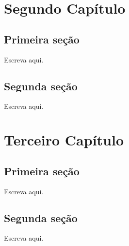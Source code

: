\documentclass[11pt,a4paper,oneside,openany]{book}
\begin{document}

\chapter{Segundo Capítulo}\label{cap:segundo}

\section{Primeira seção}

Escreva aqui.

\section{Segunda seção}

Escreva aqui.

\chapter{Terceiro Capítulo}\label{cap:terceiro}

\section{Primeira seção}

Escreva aqui.

\section{Segunda seção}

Escreva aqui.


\backmatter
\printbibliography[heading=bibintoc,title={Referências}]
\end{document}
